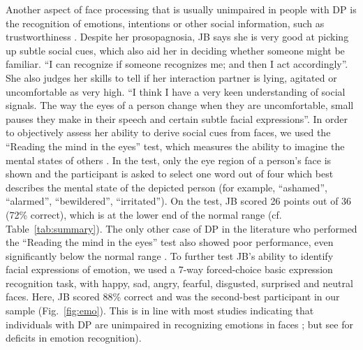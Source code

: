 \documentclass[fleqn,10pt]{SelfArx} %
\begin{document}
Another aspect of face processing that is usually unimpaired in people with DP is the recognition of emotions, intentions or other social information, such as trustworthiness \citep{Todorov_2008, Duchaine_2009}. Despite her prosopagnosia, JB says she is very good at picking up subtle social cues, which also aid her in deciding whether someone might be familiar. “I can recognize if someone recognizes me; and then I act accordingly”. She also judges her skills to tell if her interaction partner is lying, agitated or uncomfortable as very high. “I think I have a very keen understanding of social signals. The way the eyes of a person change when they are uncomfortable, small pauses they make in their speech and certain subtle facial expressions”. In order to objectively assess her ability to derive social cues from faces, we used the “Reading the mind in the eyes” test, which measures the ability to imagine the mental states of others \citep{Baron_Cohen_2001}. In the test, only the eye region of a person's face is shown and the participant is asked to select one word out of four which best describes the mental state of the depicted person (for example, “ashamed”, “alarmed”, “bewildered”, “irritated”). On the test, JB scored 26 points out of 36 (72\% correct), which is at the lower end of the normal range (cf. Table~\ref{tab:summary}). The only other case of DP in the literature who performed the “Reading the mind in the eyes” test also showed poor performance, even significantly below the normal range \citep{Duchaine_2006cog}.
To further test JB's ability to identify facial expressions of emotion, we used a 7-way forced-choice basic expression recognition task, with happy, sad, angry, fearful, disgusted, surprised and neutral faces. Here, JB scored 88\% correct and was the second-best participant in our sample (Fig.~\ref{fig:emo}). This is in line with most studies indicating that individuals with DP are unimpaired in recognizing emotions in faces \citep{Duchaine_2003, Humphreys_2006}; but see \citep{Duchaine_2006cog} for deficits in emotion recognition).
\end{document}
